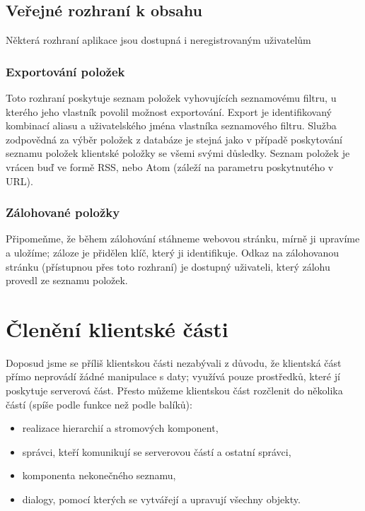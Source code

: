 \subsection{Veřejné rozhraní k obsahu}

Některá rozhraní aplikace jsou dostupná i neregistrovaným uživatelům

\subsubsection{Exportování položek}

Toto rozhraní poskytuje seznam položek vyhovujících seznamovému filtru, u kterého jeho vlastník povolil možnost exportování.
Export je identifikovaný kombinací aliasu a uživatelského jména vlastníka seznamového filtru.
Služba zodpovědná za výběr položek z databáze je stejná jako v případě poskytování seznamu položek klientské položky se všemi svými důsledky.
Seznam položek je vrácen buď ve formě RSS, nebo Atom (záleží na parametru poskytnutého v URL).

\subsubsection{Zálohované položky}

Připomeňme, že během zálohování stáhneme webovou stránku, mírně ji upravíme a uložíme; záloze je přidělen klíč, který ji identifikuje.
Odkaz na zálohovanou stránku (přístupnou přes toto rozhraní) je dostupný uživateli, který zálohu provedl ze seznamu položek.

\section{Členění klientské části}

Doposud jsme se příliš klientskou části nezabývali z důvodu, že klientská část přímo neprovádí žádné manipulace s daty; využívá pouze prostředků, které jí poskytuje serverová část.
Přesto můžeme klientskou část rozčlenit do několika částí (spíše podle funkce než podle balíků):
\begin{itemize}
	\item realizace hierarchií a stromových komponent,
	\item správci, kteří komunikují se serverovou částí a ostatní správci,
	\item komponenta nekonečného seznamu,
	\item dialogy, pomocí kterých se vytvářejí a upravují všechny objekty.
\end{itemize}

